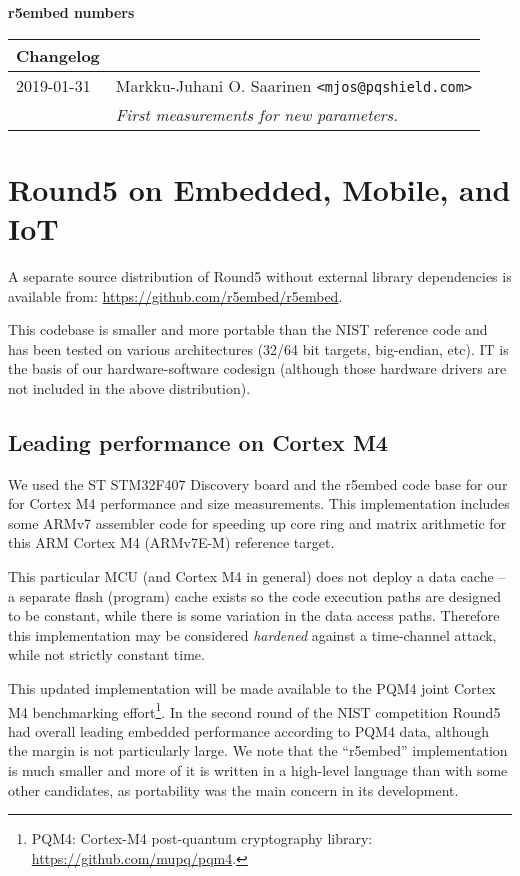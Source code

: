 \documentclass[a4paper]{article}
\begin{document}
\begin{center}
	{\large {\bf r5embed numbers \pdfdate}}

\vspace{3ex}
\begin{tabular}{l p{90mm}}
{\bf Changelog} \\
\hline
2019-01-31	& Markku-Juhani O. Saarinen \verb|<mjos@pqshield.com>| \\
			& {\it First measurements for new parameters.}	\\
\hline
\end{tabular}
\end{center}


\section{Round5 on Embedded, Mobile, and IoT}

A separate source distribution of Round5 without external library
dependencies is available from: \url{https://github.com/r5embed/r5embed}.

This codebase is smaller and more portable than the NIST reference code and has
been tested on various architectures (32/64 bit targets, big-endian, etc). IT is
the basis of our hardware-software codesign (although those hardware drivers
are not included in the above distribution).


\subsection{Leading performance on Cortex M4}

We used the ST STM32F407 Discovery board and the r5embed code base for our
for Cortex M4 performance and size measurements. This implementation
includes some ARMv7 assembler code for speeding up core ring and matrix
arithmetic for this ARM Cortex M4 (ARMv7E-M) reference target.

This particular MCU (and Cortex M4 in general) does not deploy a data cache --
a separate flash (program) cache exists so the code execution paths are
designed to be constant, while there is some variation in the data
access paths. Therefore this implementation may be considered \emph{hardened}
against a time-channel attack, while not strictly constant time.

This updated implementation will be made available to the PQM4 joint Cortex M4
benchmarking effort\footnote{PQM4: Cortex-M4 post-quantum cryptography library:
\url{https://github.com/mupq/pqm4}.}. In the second round of the NIST
competition Round5 had overall leading embedded performance according to PQM4
data, although the margin is not particularly large. We note that the
``r5embed'' implementation is much smaller and more of it is written in a
high-level language than with some other candidates, as portability was the
main concern in its development.
\end{document}
